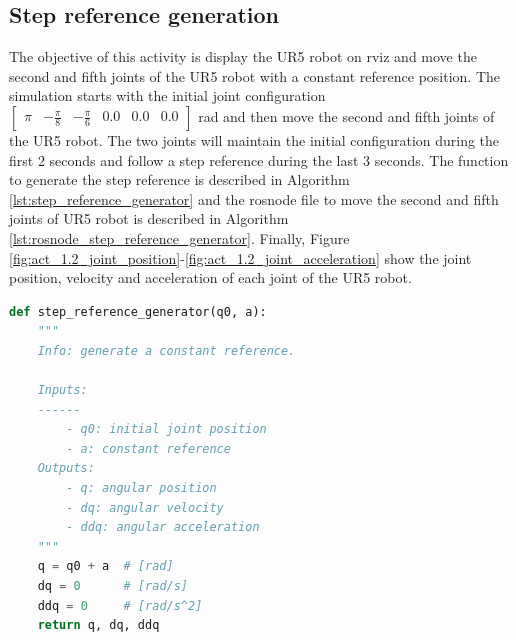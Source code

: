 \subsection{Step reference generation}
The objective of this activity is display the UR5 robot on rviz and move the second and fifth joints of the UR5 robot with a constant reference position. The simulation starts with the initial joint configuration $\begin{bmatrix} \pi & -\frac{\pi}{8} & -\frac{\pi}{6} & 0.0 & 0.0 & 0.0 \end{bmatrix}$ rad and then move the second and fifth joints of the UR5 robot. The two joints will maintain the initial configuration during the first $2$ seconds and follow a step reference during the last $3$ seconds. The function to generate the step reference is described in Algorithm \ref{lst:step_reference_generator} and the rosnode file to move the second and fifth joints of UR5 robot is described in Algorithm \ref{lst:rosnode_step_reference_generator}. Finally, Figure \ref{fig:act_1.2_joint_position}-\ref{fig:act_1.2_joint_acceleration} show the joint position, velocity and acceleration of each joint of the UR5 robot.\vspace{5px}

\begin{lstlisting}[language=Python,caption=Function to generate step reference., label={lst:step_reference_generator}]
def step_reference_generator(q0, a):
    """
    Info: generate a constant reference.

    Inputs:
    ------
        - q0: initial joint position
        - a: constant reference
    Outputs:
        - q: angular position
        - dq: angular velocity
        - ddq: angular acceleration
    """
    q = q0 + a  # [rad]
    dq = 0      # [rad/s]
    ddq = 0     # [rad/s^2]
    return q, dq, ddq
\end{lstlisting}



